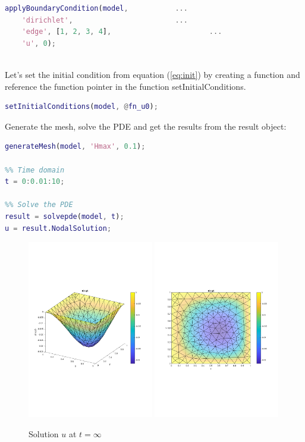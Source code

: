 \documentclass[11pt, a4paper]{article}
\begin{document}
\begin{lstlisting}[language=Matlab]
%% Boundary conditions
applyBoundaryCondition(model,           ...
    'dirichlet', 						...
    'edge', [1, 2, 3, 4],        				...
    'u', 0);
	
\end{lstlisting}

Let's set the initial condition from equation (\ref{eq:init}) by creating a function and reference the function pointer in the function setInitialConditions.

\begin{lstlisting}[language=Matlab]
%% Initial conditions.
setInitialConditions(model, @fn_u0);
\end{lstlisting}


Generate the mesh, solve the PDE and get the results from the result object:
\begin{lstlisting}[language=Matlab]
%% Generate mesh.
generateMesh(model, 'Hmax', 0.1);

%% Time domain
t = 0:0.01:10;

%% Solve the PDE
result = solvepde(model, t);
u = result.NodalSolution;
\end{lstlisting}

\begin{figure}[htb]
  \includegraphics[width=0.49\textwidth]{assets/solution_3d.pdf}
  \includegraphics[width=0.49\textwidth]{assets/solution_xy.pdf}
  \caption{Solution $u$ at $t=\infty$}\label{fig:solution}
\end{figure}
\end{document}
